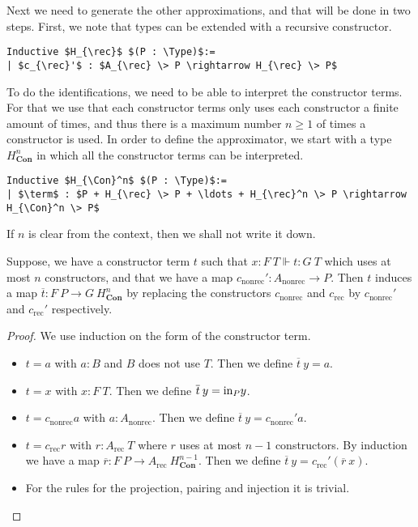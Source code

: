 \documentclass[a4paper,UKenglish]{lipics-v2016}
\newcommand{\inn}{{\rm in}}
\newcommand{\rec}[0]{\operatorname{rec}}
\newcommand{\nonrec}[0]{\operatorname{nonrec}}
\newcommand{\term}[0]{\textbf{term}}
\newcommand{\Con}[0]{\textbf{Con}}
\newcommand{\Type}[0]{\operatorname{\textsc{Type}}}
\begin{document}
Next we need to generate the other approximations, and that will be done in two steps.
First, we note that types can be extended with a recursive constructor.
\lstset{language=Coq}
\begin{lstlisting}
Inductive $H_{\rec}$ $(P : \Type)$:=
| $c_{\rec}'$ : $A_{\rec} \> P \rightarrow H_{\rec} \> P$
\end{lstlisting}
To do the identifications, we need to be able to interpret the constructor terms.
For that we use that each constructor terms only uses each constructor  a finite amount of times, and thus there is a maximum number $n \geq 1$ of times a constructor is used.
In order to define the approximator, we start with a type $H_{\Con}^n$ in which all the constructor terms can be interpreted.
\lstset{language=Coq}
\begin{lstlisting}
Inductive $H_{\Con}^n$ $(P : \Type)$:=
| $\term$ : $P + H_{\rec} \> P + \ldots + H_{\rec}^n \> P \rightarrow H_{\Con}^n \> P$
\end{lstlisting}

If $n$ is clear from the context, then we shall not write it down.

\begin{lemma}
Suppose, we have a constructor term $t$ such that $x : F \> T \Vdash t : G \>T$ which uses at most $n$ constructors, and that we have a map $c_{\nonrec}' : A_{\nonrec} \rightarrow P$.
Then $t$ induces a map $\overline{t} : F \> P \rightarrow G \> H_{\Con}^n$ by replacing the constructors $c_{\nonrec}$ and $c_{\rec}$ by $c_{\nonrec}'$ and $c_{\rec}'$ respectively.
\end{lemma}

\begin{proof}
We use induction on the form of the constructor term.
\begin{itemize}
	\item $t = a$ with $a : B$ and $B$ does not use $T$. Then we define $\overline{t} \> y = a$.
	\item $t = x$ with $x : F \> T$. Then we define $\overline{t} \> y = \inn_P y$.
	\item $t = c_{\nonrec} a$ with $a : A_{\nonrec}$. Then we define $\overline{t} \> y = c_{\nonrec}' a$.
	\item $t = c_{\rec} r$ with $r : A_{\rec} \> T$ where $r$ uses at most $n-1$ constructors. 
			  By induction we have a map $\overline{r} : F \> P \rightarrow A_{\rec} \> H_{\Con}^{n-1}$.
			  Then we define $\overline{t} \> y = c_{\rec}' (\overline{r} \> x)$.
	\item For the rules for the projection, pairing and injection it is trivial. \qedhere
\end{itemize}
\end{proof}
\end{document}

